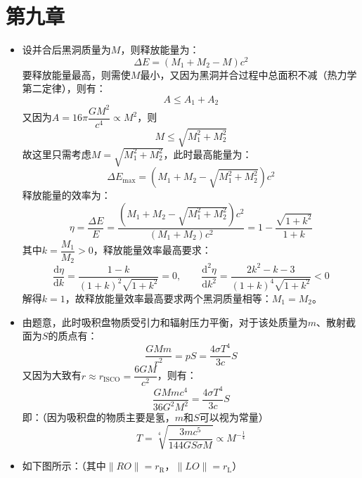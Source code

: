 \documentclass[a4paper,fontset=none]{ctexart}
\begin{document}
\begin{itemize}
    \end{itemize}

    \section*{第九章}

    \begin{itemize}

        \item[1.]
        设并合后黑洞质量为$M$，则释放能量为：
        \[
        \Delta E = (M_1 + M_2 - M)c^2
        \]
        要释放能量最高，则需使$M$最小，又因为黑洞并合过程中总面积不减（热力学第二定律），则有：
        \[
        A \leqslant A_1 + A_2
        \]
        又因为$A = 16\pi\dfrac{GM^2}{c^4} \propto M^2$，则
        \[
        M \leqslant \sqrt{M_1^2 + M_2^2}
        \]
        故这里只需考虑$M = \sqrt{M_1^2 + M_2^2}$，此时最高能量为：
        \[
        \Delta E_{\mathrm{max}} = (M_1 + M_2 - \sqrt{M_1^2 + M_2^2})c^2
        \]
        释放能量的效率为：
        \[
        \eta = \frac{\Delta E}{E} = \frac{(M_1 + M_2 - \sqrt{M_1^2 + M_2^2})c^2}{(M_1 + M_2)c^2} = 1 - \frac{\sqrt{1+k^2}}{1+k}
        \]
        其中$k = \dfrac{M_1}{M_2} > 0$，释放能量效率最高要求：
        \[
        \frac{\mathrm{d}\eta}{\mathrm{d}k} = \frac{1-k}{(1+k)^2\sqrt{1+k^2}} = 0,\qquad \frac{\mathrm{d}^2\eta}{\mathrm{d}k^2} = \frac{2k^2-k-3}{(1+k)^4\sqrt{1+k^2}} < 0
        \]
        解得$k=1$，故释放能量效率最高要求两个黑洞质量相等：$M_1 = M_2$。

        \item[4.]
        由题意，此时吸积盘物质受引力和辐射压力平衡，对于该处质量为$m$、散射截面为$S$的质点有：
        \[
        \frac{GMm}{r^2} = pS = \frac{4\sigma T^4}{3c}S
        \]
        又因为大致有$r \approx r_{\mathrm{ISCO}} = \dfrac{6GM}{c^2}$，则有：
        \[
        \frac{GMmc^4}{36G^2 M^2} = \frac{4\sigma T^4}{3c}S
        \]
        即：（因为吸积盘的物质主要是氢，$m$和$S$可以视为常量）
        \[
        T = \sqrt[4]{\frac{3mc^5}{144GS\sigma M}} \propto M^{-\tfrac{1}{4}}
        \]

        \item[5.]
        \setcounter{equation}{0}
        如下图所示：（其中$\|RO\| = r_{\mathrm{R}}$，$\|LO\| = r_{\mathrm{L}}$）
        

\end{itemize}
\end{document}
